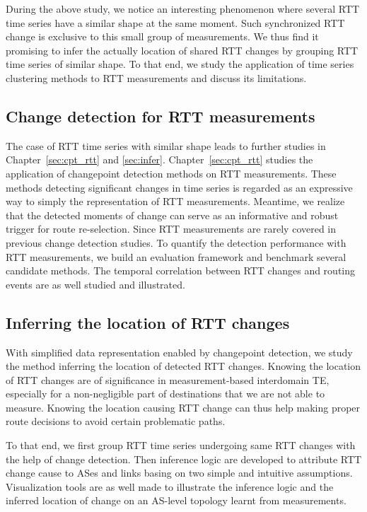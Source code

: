 During the above study, we notice an interesting phenomenon where several RTT time series have a similar shape at the same moment. Such synchronized RTT change is exclusive to this small group of measurements.
We thus find it promising to infer the actually location of shared RTT changes by grouping RTT time series of similar shape. To that end, we study the application of time series clustering methods to RTT measurements and discuss its limitations.

\subsection{Change detection for RTT measurements}
The case of RTT time series with similar shape leads to further studies in Chapter~\ref{sec:cpt_rtt} and \ref{sec:infer}. Chapter~\ref{sec:cpt_rtt} studies the application of changepoint detection methods on RTT measurements. These methods detecting significant changes in time series is regarded as an expressive way to simply the representation of RTT measurements. Meantime, we realize that the detected moments of change can serve as an informative and robust trigger for route re-selection.
Since RTT measurements are rarely covered in previous change detection studies. To quantify the detection performance with RTT measurements, we build an evaluation framework and benchmark several candidate methods.
The temporal correlation between RTT changes and routing events are as well studied and illustrated.

\subsection{Inferring the location of RTT changes}
With simplified data representation enabled by changepoint detection, we study the method inferring the location of detected RTT changes.
Knowing the location of RTT changes are of significance in measurement-based interdomain TE,  especially for a non-negligible part of destinations that we are not able to measure. Knowing the location causing RTT change can thus help making proper route decisions to avoid certain problematic paths.

To that end, we first group RTT time series undergoing same RTT changes with the help of change detection.
Then inference logic are developed to attribute RTT change cause to ASes and links basing on two simple and intuitive assumptions.
Visualization tools are as well made to illustrate the inference logic and the inferred location of change on an AS-level topology learnt from measurements.
